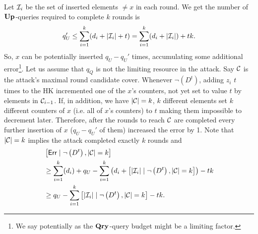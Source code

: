 Let $\mathcal{I}_i$ be the set of inserted elements $\not= x$ in each round.
We get the number of $\textup{\textbf{Up}}\hspace{0.5pt}$-queries required to complete $k$ rounds is
\begin{align}
	q_U' \leq \sum_{i = 1}^{k} (d_i + |\mathcal{I}_i| + t) = \sum_{i = 1}^{k} (d_i + |\mathcal{I}_i|) + tk.
\end{align}
So, $x$ can be potentially inserted $q_U-q_U'$ times, accumulating some additional error\footnote{We say potentially as the $\textup{\textbf{Qry}}\hspace{0.5pt}$-query budget might be a limiting factor.}.
Let us assume that $q_Q$ is not the limiting resource in the attack. Say $\mathcal{C}$ is the attack's maximal round candidate cover. 
Whenever $\lnot \left(D^t\right)$, 
adding $z_i$ $t$ times to the HK incremented one of the $x$'s counters, not yet set to value $t$ by elements in $\mathcal{C}_{i-1}$.
If, in addition, we have $|\mathcal{C}| = k$, $k$ different elements set $k$ different counters of $x$ (i.e. all of  $x$'s counters) to $t$ making them impossible to decrement later. 
Therefore, after the rounds to reach $\mathcal{C}$ are completed every further insertion of $x$ ($q_U-q_U'$ of them) increased the error by 1.
Note that $|\mathcal{C}| = k$ implies the attack completed exactly $k$ rounds and 
\begin{align*}
	&\left[\mathsf{Err} \mid \lnot \left(D^t\right), |\mathcal{C}| = k \right] \\
	&\geq \sum_{i = 1}^k (d_i) + q_U -  \sum_{i = 1}^{k} \left(d_i + \left[|\mathcal{I}_i|\mid \lnot \left(D^t\right), |\mathcal{C}| = k \right] \right) - tk\\
	&\geq  q_U -  \sum_{i = 1}^{k} \left[|\mathcal{I}_i|\mid \lnot \left(D^t\right), |\mathcal{C}| = k \right] - tk.\\
\end{align*}

